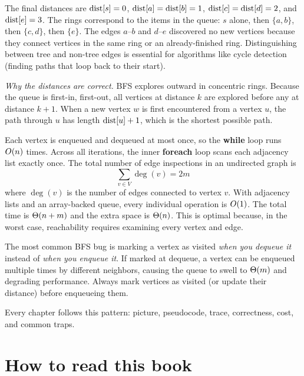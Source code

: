 The final distances are $\operatorname{dist}[s]=0$, $\operatorname{dist}[a]=\operatorname{dist}[b]=1$, $\operatorname{dist}[c]=\operatorname{dist}[d]=2$, and $\operatorname{dist}[e]=3$. The rings correspond to the items in the queue: $s$ alone, then $\{a,b\}$, then $\{c,d\}$, then $\{e\}$. The edges $a$--$b$ and $d$--$e$ discovered no new vertices because they connect vertices in the same ring or an already-finished ring. Distinguishing between tree and non-tree edges is essential for algorithms like cycle detection (finding paths that loop back to their start).

\begin{whybox}
\emph{Why the distances are correct.} BFS explores outward in concentric rings. Because the queue is first-in, first-out, all vertices at distance $k$ are explored before any at distance $k+1$. When a new vertex $w$ is first encountered from a vertex $u$, the path through $u$ has length $\operatorname{dist}[u] + 1$, which is the shortest possible path.
\end{whybox}

\begin{complexitybox}
Each vertex is enqueued and dequeued at most once, so the \textbf{while} loop runs $O(n)$ times. Across all iterations, the inner \textbf{foreach} loop scans each adjacency list exactly once. The total number of edge inspections in an undirected graph is
\[ \sum_{v \in V} \deg(v) = 2m \]
where $\deg(v)$ is the number of edges connected to vertex $v$. With adjacency lists and an array-backed queue, every individual operation is $O(1)$. The total time is $\Theta(n+m)$ and the extra space is $\Theta(n)$. This is optimal because, in the worst case, reachability requires examining every vertex and edge.
\end{complexitybox}

\begin{trapbox}
The most common BFS bug is marking a vertex as visited \emph{when you dequeue it} instead of \emph{when you enqueue it}. If marked at dequeue, a vertex can be enqueued multiple times by different neighbors, causing the queue to swell to $\Theta(m)$ and degrading performance. Always mark vertices as visited (or update their distance) before enqueueing them.
\end{trapbox}

Every chapter follows this pattern: picture, pseudocode, trace, correctness, cost, and common traps.

\section*{How to read this book}

